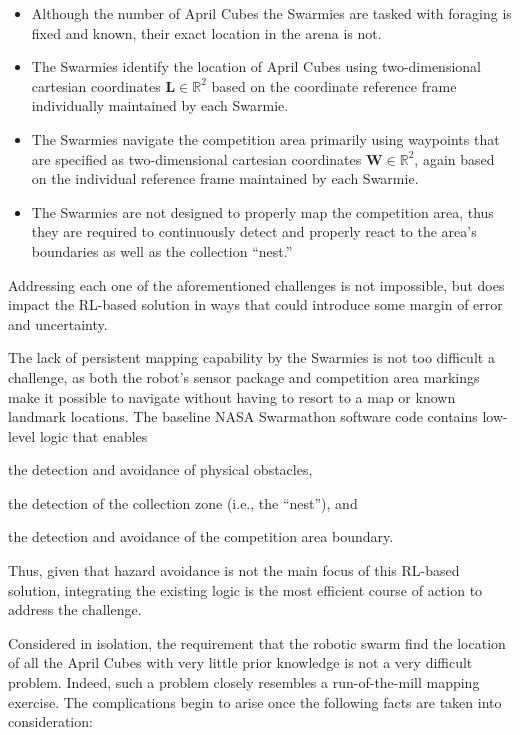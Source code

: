 \documentclass[sigconf,authordraft]{acmart}
\begin{document}
\begin{itemize}
  \item Although the number of April Cubes the Swarmies are tasked with foraging is fixed and known, their exact location in the arena is not.
  \item The Swarmies identify the location of April Cubes using two-dimensional cartesian coordinates $\textbf{L} \in \mathbb{R}^2$ based on the coordinate reference frame individually maintained by each Swarmie.
  \item The Swarmies navigate the competition area primarily using waypoints that are specified as two-dimensional cartesian coordinates $\textbf{W} \in \mathbb{R}^2$, again based on the individual reference frame maintained by each Swarmie.
  \item The Swarmies are not designed to properly map the competition area, thus they are required to continuously detect and properly react to the area's boundaries as well as the collection ``nest.''
\end{itemize}

Addressing each one of the aforementioned challenges is not impossible, but does impact the RL-based solution in ways that could introduce some margin of error and uncertainty.

The lack of persistent mapping capability by the Swarmies is not too difficult a challenge, as both the robot's sensor package and competition area markings make it possible to navigate without having to resort to a map or known landmark locations. The baseline NASA Swarmathon software code contains low-level logic that enables
\begin{enumerate*}[label={(\arabic*)}]
  \item the detection and avoidance of physical obstacles,
  \item the detection of the collection zone (i.e., the ``nest''), and
  \item the detection and avoidance of the competition area boundary.
\end{enumerate*}
Thus, given that hazard avoidance is not the main focus of this RL-based solution, integrating the existing logic is the most efficient course of action to address the challenge.

Considered in isolation, the requirement that the robotic swarm find the location of all the April Cubes with very little prior knowledge is not a very difficult problem. Indeed, such a problem closely resembles a run-of-the-mill mapping exercise. The complications begin to arise once the following facts are taken into consideration:
\end{document}
